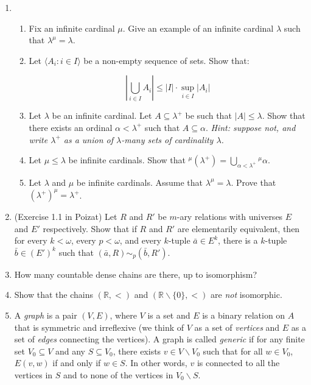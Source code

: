 \documentclass{amsart}
\theoremstyle{definition}
\newcommand{\ba}{\bar{a}}
\newcommand{\bb}{\bar{b}}
\newcommand{\seq}[1]{\langle #1 \rangle}
\newcommand{\fct}[2]{{}^{#1}{#2}}
\begin{document}
\begin{enumerate}
\item
  \begin{enumerate}
  \item Fix an infinite cardinal $\mu$. Give an example of an infinite cardinal $\lambda$ such that $\lambda^{\mu} = \lambda$.
  \item Let $\seq{A_i : i \in I}$ be a non-empty sequence of sets. Show that:

    $$
    \left| \bigcup_{i \in I} A_i \right| \le |I| \cdot \sup_{i \in I} |A_i| 
    $$
  \item Let $\lambda$ be an infinite cardinal. Let $A \subseteq \lambda^+$ be such that $|A| \le \lambda$. Show that there exists an ordinal $\alpha < \lambda^+$ such that $A \subseteq \alpha$. \emph{Hint: suppose not, and write $\lambda^+$ as a union of $\lambda$-many sets of cardinality $\lambda$.}
  \item Let $\mu \le \lambda$ be infinite cardinals. Show that $\fct{\mu}{\left(\lambda^+\right)} = \bigcup_{\alpha < \lambda^+} \fct{\mu}{\alpha}$.

  \item Let $\lambda$ and $\mu$ be infinite cardinals. Assume that $\lambda^\mu = \lambda$. Prove that $\left(\lambda^+\right)^\mu = \lambda^+$.
  \end{enumerate}
\item (Exercise 1.1 in Poizat) Let $R$ and $R'$ be $m$-ary relations with universes $E$ and $E'$ respectively. Show that if $R$ and $R'$ are elementarily equivalent, then for every $k < \omega$, every $p < \omega$, and every $k$-tuple $\ba \in E^k$, there is a $k$-tuple $\bb \in (E')^k$ such that $(\ba, R) \sim_p (\bb, R')$.
\item How many countable dense chains are there, up to isomorphism?
\item Show that the chains $(\mathbb{R}, <)$ and $(\mathbb{R} \backslash \{0\}, <)$ are \emph{not} isomorphic.
\item A \emph{graph} is a pair $(V, E)$, where $V$ is a set and $E$ is a binary relation on $A$ that is symmetric and irreflexive (we think of $V$ as a set of \emph{vertices} and $E$ as a set of \emph{edges} connecting the vertices). A graph is called \emph{generic} if for any finite set $V_0 \subseteq V$ and any $S \subseteq V_0$, there exists $v \in V \backslash V_0$ such that for all $w \in V_0$, $E (v, w)$ if and only if $w \in S$. In other words, $v$ is connected to all the vertices in $S$ and to none of the vertices in $V_0 \backslash S$.


\end{enumerate}
\end{document}
